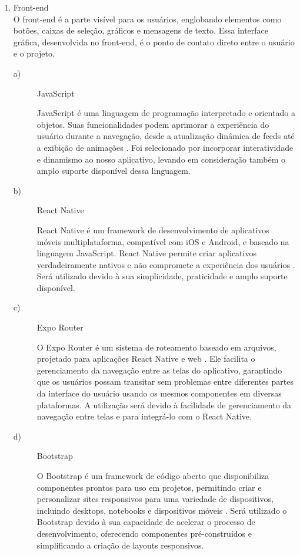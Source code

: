 \documentclass[
    article,			%
    12pt,				%
    oneside,            %
    a4paper,			%
    english,			%
    brazil,				%
    ]{abntex2}
\begin{document}
\begin{enumerate}
    \item Front-end \\
        O front-end é a parte visível para os usuários, englobando elementos como botões, caixas de seleção, gráficos e mensagens de texto. Essa interface gráfica, desenvolvida no  front-end, é o ponto de contato direto entre o usuário e o projeto.\\

\begin{description}
    \item[a)] JavaScript \par JavaScript é uma linguagem de programação interpretado e orientado a objetos. Suas funcionalidades podem aprimorar a experiência do usuário durante a navegação, desde a atualização dinâmica de feeds até a exibição de animações \cite{JS}. Foi selecionado por incorporar interatividade e dinamismo ao nosso aplicativo, levando em consideração também o amplo suporte disponível dessa linguagem. \\

    \item[b)] React Native \par React Native é um framework de desenvolvimento de aplicativos móveis multiplataforma, compatível com iOS e Android, e baseado na linguagem JavaScript. React Native permite criar aplicativos verdadeiramente nativos e não compromete a experiência dos usuários \cite{reactnative}. Será utilizado devido à sua simplicidade, praticidade e amplo suporte disponível. \\

    \item[c)] Expo Router \par O Expo Router é um sistema de roteamento baseado em arquivos, projetado para aplicações React Native e web \cite{Navegação_RN/ER}. Ele facilita o gerenciamento da navegação entre as telas do aplicativo, garantindo que os usuários possam transitar sem problemas entre diferentes partes da interface do usuário usando os mesmos componentes em diversas plataformas. A utilização será devido à facilidade de gerenciamento da navegação entre telas e para integrá-lo com o React Native. \\

    \item[d)] Bootstrap \par O Bootstrap é um framework de código aberto que disponibiliza componentes prontos para uso em projetos, permitindo criar e personalizar sites responsivos para uma variedade de dispositivos, incluindo desktops, notebooks e dispositivos móveis \cite{Bootstrap}. Será utilizado o Bootstrap devido à sua capacidade de acelerar o processo de desenvolvimento, oferecendo componentes pré-construídos e simplificando a criação de layouts responsivos. \\  
\end{description}


\end{enumerate}
\end{document}
